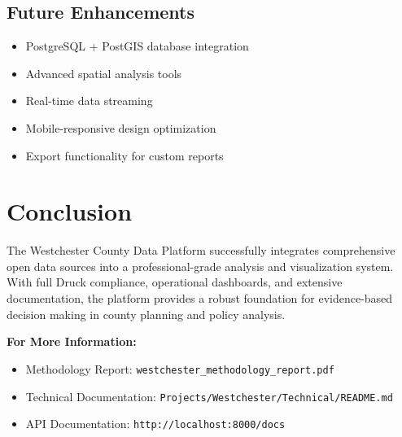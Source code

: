 \documentclass[11pt,letterpaper]{article}
\begin{document}
\subsection*{Future Enhancements}
\begin{itemize}
    \item PostgreSQL + PostGIS database integration
    \item Advanced spatial analysis tools
    \item Real-time data streaming
    \item Mobile-responsive design optimization
    \item Export functionality for custom reports
\end{itemize}

\section*{Conclusion}

The Westchester County Data Platform successfully integrates comprehensive open data sources into a professional-grade analysis and visualization system. With full Druck compliance, operational dashboards, and extensive documentation, the platform provides a robust foundation for evidence-based decision making in county planning and policy analysis.

\vspace{1em}

\textbf{For More Information:}
\begin{itemize}
    \item Methodology Report: \texttt{westchester\_methodology\_report.pdf}
    \item Technical Documentation: \texttt{Projects/Westchester/Technical/README.md}
    \item API Documentation: \texttt{http://localhost:8000/docs}
\end{itemize}
\end{document}
